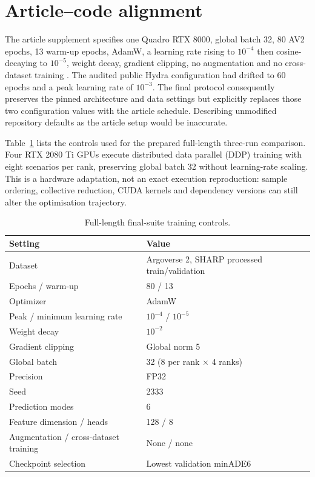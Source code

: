 \section{Article--code alignment}

The article supplement specifies one Quadro RTX 8000, global batch 32, 80 AV2 epochs, 13 warm-up epochs, AdamW, a learning rate rising to $10^{-4}$ then cosine-decaying to $10^{-5}$, weight decay, gradient clipping, no augmentation and no cross-dataset training \cite{prutsch2026sharp}. The audited public Hydra configuration had drifted to 60 epochs and a peak learning rate of $10^{-3}$. The final protocol consequently preserves the pinned architecture and data settings but explicitly replaces those two configuration values with the article schedule. Describing unmodified repository defaults as the article setup would be inaccurate.

Table~\ref{tab:final-controls} lists the controls used for the prepared full-length three-run comparison. Four RTX 2080 Ti GPUs execute distributed data parallel (DDP) training with eight scenarios per rank, preserving global batch 32 without learning-rate scaling. This is a hardware adaptation, not an exact execution reproduction: sample ordering, collective reduction, CUDA kernels and dependency versions can still alter the optimisation trajectory.

\begin{table}[htbp]
\centering
\caption{Full-length final-suite training controls.}
\label{tab:final-controls}
\small
\begin{tabular}{p{}p{}}
\hline
Setting & Value \\
\hline
Dataset & Argoverse 2, SHARP processed train/validation \\
Epochs / warm-up & 80 / 13 \\
Optimizer & AdamW \\
Peak / minimum learning rate & $10^{-4}$ / $10^{-5}$ \\
Weight decay & $10^{-2}$ \\
Gradient clipping & Global norm 5 \\
Global batch & 32 (8 per rank $\times$ 4 ranks) \\
Precision & FP32 \\
Seed & 2333 \\
Prediction modes & 6 \\
Feature dimension / heads & 128 / 8 \\
Augmentation / cross-dataset training & None / none \\
Checkpoint selection & Lowest validation minADE6 \\
\hline
\end{tabular}
\end{table}

